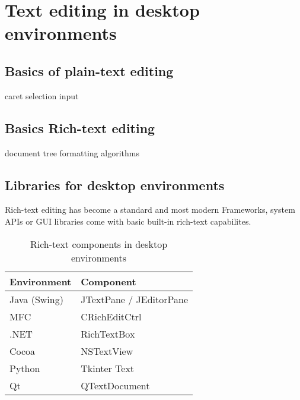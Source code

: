 
\chapter{Text editing in desktop environments}

\section{Basics of plain-text editing} %

caret
selection
input

\section{Basics Rich-text editing} %

document tree
formatting algorithms


\section{Libraries for desktop environments}

Rich-text editing has become a standard and most modern Frameworks, system APIs or GUI libraries come with basic built-in rich-text capabilites.

\begin{table}[]
\centering
\begin{tabular}{ll}
\hline
Environment & Component \\ \hline
Java (Swing) & JTextPane / JEditorPane \\
MFC & CRichEditCtrl \\
.NET & RichTextBox \\
Cocoa & NSTextView \\
Python & Tkinter Text \\
Qt & QTextDocument \\ \hline
\end{tabular}
\caption{Rich-text components in desktop environments}
\label{rich-text-components-desktop}
\end{table}

